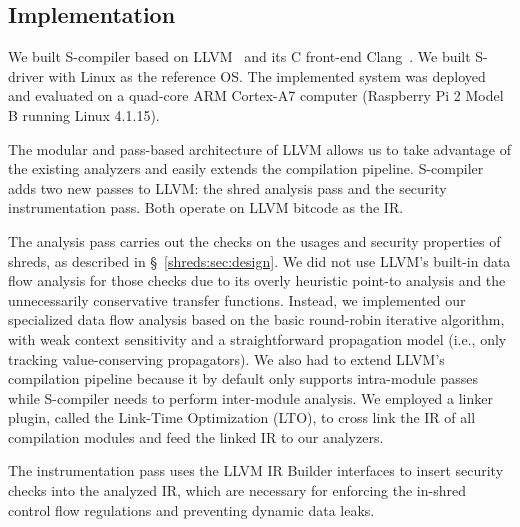 \subsection{Implementation}
\label{shreds:sec:impl}

We built S-compiler based on LLVM~\cite{lattner2004llvm} and its C front-end  Clang~\cite{clang}. We built S-driver with Linux as the reference OS. The implemented system was deployed and evaluated on a quad-core ARM Cortex-A7 computer (Raspberry Pi 2 Model B running Linux 4.1.15).

The modular and pass-based architecture of LLVM allows us to take advantage of the existing analyzers and easily extends the compilation pipeline. 
S-compiler adds two new passes to LLVM: the shred analysis pass and the security instrumentation pass. Both operate on LLVM bitcode as the IR. 

The analysis pass carries out the checks on the usages and security properties of shreds, as described in \S~\ref{shreds:sec:design}. 
We did not use LLVM's built-in data flow analysis for those checks due to its overly heuristic point-to analysis and the unnecessarily conservative transfer functions.
Instead, we implemented our specialized data flow analysis based on the basic round-robin iterative algorithm, with weak context sensitivity and a straightforward propagation model (i.e., only tracking value-conserving propagators).
We also had to extend LLVM's compilation pipeline because it by default only supports intra-module passes while S-compiler needs to perform inter-module analysis. We employed a linker plugin, called the Link-Time Optimization (LTO), to cross link the IR of all compilation modules and feed the linked IR to our analyzers. 


The instrumentation pass uses the LLVM IR Builder interfaces to insert security checks into the analyzed IR, which are necessary for enforcing the in-shred control flow regulations and preventing dynamic data leaks. 

